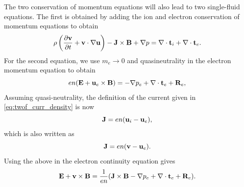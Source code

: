 \documentclass[a4paper,11pt]{report}
\begin{document}
The two conservation of momentum equations will also lead to two single-fluid equations. The first is obtained by adding the ion and electron conservation of momentum equations to obtain
\begin{equation}
\label{eq:generalized_MHD_vel}
    \rho \left (\frac{\partial \mathbf{v}}{\partial t} + \mathbf{v} \cdot \nabla \mathbf{u} \right) - \mathbf{J} \times \mathbf{B} + \nabla p = \nabla \cdot \mathbf{t}_i + \nabla \cdot \mathbf{t}_e.
\end{equation}
For the second equation, we use $m_e \to 0$ and quasineutrality in the electron momentum equation to obtain
\begin{equation}
    e n ( \mathbf{E} + \mathbf{u}_e \times \mathbf{B} ) = - \nabla p_e + \nabla \cdot \mathbf{t}_e + \mathbf{R}_e,
\end{equation}
Assuming quasi-neutrality, the definition of the current given in \cref{eq:twof_curr_density} is now
\begin{equation}
\label{eq:current_def_quasineutral}
    \mathbf{J} = e n (\mathbf{u}_i - \mathbf{u}_e),
\end{equation}
which is also written as
\begin{equation}
    \mathbf{J} = e n (\mathbf{v} - \mathbf{u}_e).
\end{equation}
Using the above in the electron continuity equation gives
\begin{equation}
\label{eq:generalized_MHD_ohms}
    \mathbf{E} + \mathbf{v} \times \mathbf{B} = \frac{1}{en} ( \mathbf{J} \times \mathbf{B} - \nabla p_e + \nabla \cdot \mathbf{t}_e + \mathbf{R}_e).
\end{equation}
\end{document}
